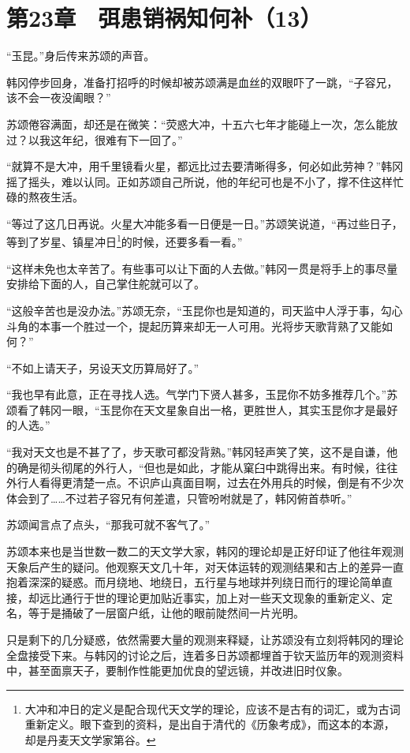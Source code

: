 \section{第23章　弭患销祸知何补（13）}

“玉昆。”身后传来苏颂的声音。

韩冈停步回身，准备打招呼的时候却被苏颂满是血丝的双眼吓了一跳，“子容兄，该不会一夜没阖眼？”

苏颂倦容满面，却还是在微笑：“荧惑大冲，十五六七年才能碰上一次，怎么能放过？以我这年纪，很难有下一回了。”

“就算不是大冲，用千里镜看火星，都远比过去要清晰得多，何必如此劳神？”韩冈摇了摇头，难以认同。正如苏颂自己所说，他的年纪可也是不小了，撑不住这样忙碌的熬夜生活。

“等过了这几日再说。火星大冲能多看一日便是一日。”苏颂笑说道，“再过些日子，等到了岁星、镇星冲日\footnote{大冲和冲日的定义是配合现代天文学的理论，应该不是古有的词汇，或为古词重新定义。眼下查到的资料，是出自于清代的《历象考成》，而这本的本源，却是丹麦天文学家第谷。}的时候，还要多看一看。”

“这样未免也太辛苦了。有些事可以让下面的人去做。”韩冈一贯是将手上的事尽量安排给下面的人，自己掌住舵就可以了。

“这般辛苦也是没办法。”苏颂无奈，“玉昆你也是知道的，司天监中人浮于事，勾心斗角的本事一个胜过一个，提起历算来却无一人可用。光将步天歌背熟了又能如何？”

“不如上请天子，另设天文历算局好了。”

“我也早有此意，正在寻找人选。气学门下贤人甚多，玉昆你不妨多推荐几个。”苏颂看了韩冈一眼，“玉昆你在天文星象自出一格，更胜世人，其实玉昆你才是最好的人选。”

“我对天文也是不甚了了，步天歌可都没背熟。”韩冈轻声笑了笑，这不是自谦，他的确是彻头彻尾的外行人，“但也是如此，才能从窠臼中跳得出来。有时候，往往外行人看得更清楚一点。不识庐山真面目啊，过去在外用兵的时候，倒是有不少次体会到了……不过若子容兄有何差遣，只管吩咐就是了，韩冈俯首恭听。”

苏颂闻言点了点头，“那我可就不客气了。”

苏颂本来也是当世数一数二的天文学大家，韩冈的理论却是正好印证了他往年观测天象后产生的疑问。他观察天文几十年，对天体运转的观测结果和古上的差异一直抱着深深的疑惑。而月绕地、地绕日，五行星与地球并列绕日而行的理论简单直接，却远比通行于世的理论更加贴近事实，加上对一些天文现象的重新定义、定名，等于是捅破了一层窗户纸，让他的眼前陡然间一片光明。

只是剩下的几分疑惑，依然需要大量的观测来释疑，让苏颂没有立刻将韩冈的理论全盘接受下来。与韩冈的讨论之后，连着多日苏颂都埋首于钦天监历年的观测资料中，甚至面禀天子，要制作性能更加优良的望远镜，并改进旧时仪象。

